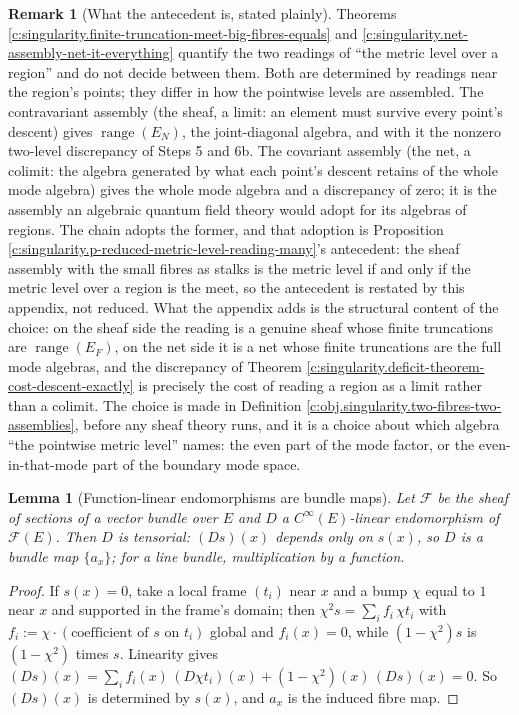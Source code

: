 \documentclass[11pt]{article}
\newtheorem{lemma}[theorem]{Lemma}
\theoremstyle{definition}
\newtheorem{remark}[theorem]{Remark}
\theoremstyle{plain}
\providecommand{\EN}{}\renewcommand{\EN}{E_{N}}
\begin{document}
\begin{remark}[What the antecedent is, stated plainly]\label{c:note.singularity.what-antecedent-stated-plainly}
Theorems \ref{c:singularity.finite-truncation-meet-big-fibres-equals} and \ref{c:singularity.net-assembly-net-it-everything} quantify the two readings of ``the metric level over a region'' and do not decide between them. Both are determined by readings near the region's points; they differ in how the pointwise levels are assembled. The contravariant assembly (the sheaf, a limit: an element must survive every point's descent) gives $\operatorname{range}(\EN)$, the joint-diagonal algebra, and with it the nonzero two-level discrepancy of Steps 5 and 6b. The covariant assembly (the net, a colimit: the algebra generated by what each point's descent retains of the whole mode algebra) gives the whole mode algebra and a discrepancy of zero; it is the assembly an algebraic quantum field theory would adopt for its algebras of regions. The chain adopts the former, and that adoption is Proposition \ref{c:singularity.p-reduced-metric-level-reading-many}'s antecedent: the sheaf assembly with the small fibres as stalks is the metric level if and only if the metric level over a region is the meet, so the antecedent is restated by this appendix, not reduced. What the appendix adds is the structural content of the choice: on the sheaf side the reading is a genuine sheaf whose finite truncations are $\operatorname{range}(E_F)$, on the net side it is a net whose finite truncations are the full mode algebras, and the discrepancy of Theorem \ref{c:singularity.deficit-theorem-cost-descent-exactly} is precisely the cost of reading a region as a limit rather than a colimit. The choice is made in Definition \ref{c:obj.singularity.two-fibres-two-assemblies}, before any sheaf theory runs, and it is a choice about which algebra ``the pointwise metric level'' names: the even part of the mode factor, or the even-in-that-mode part of the boundary mode space.
\end{remark}

\begin{lemma}[Function-linear endomorphisms are bundle maps]\label{c:singularity.function-linear-endomorphisms-are-bundle-maps}
Let $\mathcal{F}$ be the sheaf of sections of a vector bundle over $E$ and $D$ a $C^\infty(E)$-linear endomorphism of $\mathcal{F}(E)$. Then $D$ is tensorial: $(Ds)(x)$ depends only on $s(x)$, so $D$ is a bundle map $\{a_x\}$; for a line bundle, multiplication by a function.
\end{lemma}
\begin{proof}
If $s(x) = 0$, take a local frame $(t_i)$ near $x$ and a bump $\chi$ equal to $1$ near $x$ and supported in the frame's domain; then $\chi^2 s = \sum_i f_i\, \chi t_i$ with $f_i := \chi \cdot (\text{coefficient of } s \text{ on } t_i)$ global and $f_i(x) = 0$, while $(1 - \chi^2)s$ is $(1 - \chi^2)$ times $s$. Linearity gives $(Ds)(x) = \sum_i f_i(x)\,(D\chi t_i)(x) + (1 - \chi^2)(x)\,(Ds)(x) = 0$. So $(Ds)(x)$ is determined by $s(x)$, and $a_x$ is the induced fibre map.

\end{proof}
\end{document}
